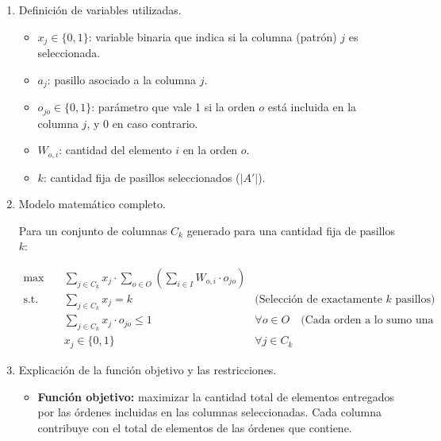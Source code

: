 \documentclass[a4paper,12pt]{article}
\begin{document}
\begin{enumerate}[label=(\alph*), leftmargin=2em]
\begin{enumerate}[label=\roman*., leftmargin=0.2em]
        \item Definición de variables utilizadas.

            \begin{itemize}
                \item \(x_j \in \{0,1\}\): variable binaria que indica si la columna (patrón) \(j\) es seleccionada.
                \item \(a_j\): pasillo asociado a la columna \(j\).
                \item \(o_{jo} \in \{0,1\}\): parámetro que vale 1 si la orden \(o\) está incluida en la columna \(j\), y 0 en caso contrario.
                \item \(W_{o,i}\): cantidad del elemento \(i\) en la orden \(o\).
                \item \(k\): cantidad fija de pasillos seleccionados (\(|A'|\)).
            \end{itemize}

        \item Modelo matemático completo.

            Para un conjunto de columnas \(C_k\) generado para una cantidad fija de pasillos \(k\):

            \[
            \begin{aligned}
            \max \quad & \sum_{j \in C_k} x_j \cdot \sum_{o \in O} \left( \sum_{i \in I} W_{o,i}  \cdot o_{jo}\right) \\
            \text{s.t.} \quad
            & \sum_{j \in C_k} x_j = k & \text{(Selección de exactamente $k$ pasillos)} \\
            & \sum_{j \in C_k} x_j \cdot o_{jo} \leq 1 & \forall o \in O \quad \text{(Cada orden a lo sumo una vez)} \\
            & x_j \in \{0,1\} & \forall j \in C_k
            \end{aligned}
            \]

        \item Explicación de la función objetivo y las restricciones.

            \begin{itemize}
                \item \textbf{Función objetivo:} maximizar la cantidad total de elementos entregados por las órdenes incluidas en las columnas seleccionadas. Cada columna contribuye con el total de elementos de las órdenes que contiene.
                

\end{itemize}
\end{enumerate}
\end{enumerate}
\end{document}
